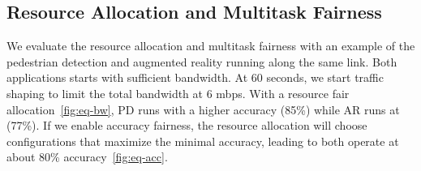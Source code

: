 \newpage

\subsection{Resource Allocation and Multitask Fairness}
\label{sec:multi-task-alloc}

We evaluate the resource allocation and multitask fairness with an example of
the pedestrian detection and augmented reality running along the same link. Both
applications starts with sufficient bandwidth. At 60 seconds, we start traffic
shaping to limit the total bandwidth at 6 mbps. With a resource fair
allocation~\autoref{fig:eq-bw}, PD runs with a higher accuracy (85\%) while AR
runs at (77\%). If we enable accuracy fairness, the resource allocation will
choose configurations that maximize the minimal accuracy, leading to both
operate at about 80\% accuracy~\autoref{fig:eq-acc}.


